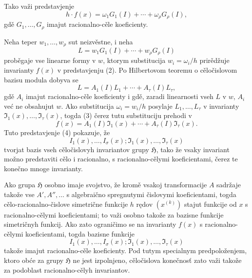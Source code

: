 \documentclass[11pt]{article}
\providecommand{\frH}{\mathfrak H}
\begin{document}
Tako važi predstavjenje
\begin{equation}
        h\cdot f(x)=\omega_1G_1(I)+\cdots+\omega_\rho G_\rho(I),
\end{equation}
gdě \(G_1,\ldots,G_\rho\) imajut racionalno-cěle koeficienty.

Neha teper \(w_1,\ldots,w_\rho\) sut neizvěstne, i neha
\[
        L=w_1G_1(I)+\cdots+w_\rho G_\rho(I)
\]
proběgaje vse linearne formy v \(w\), ktorym substitucija \(w_i=\omega_i/h\) prirědžuje invarianty \(f(x)\) v predstavjenju (2). Po Hilbertovom teoremu o cěločislovom bazisu modula dobyva se
\begin{equation}
        L=A_1(I)L_1+\cdots+A_\tau(I)L_\tau,
\end{equation}
gdě \(A_i\) imajut racionalno-cěle koeficienty i gdě, zaradi linearnosti vseh \(L\) v \(w\), \(A_i\) već ne obsahujut \(w\). Ako substitucija \(\omega_i=w_i/h\) posylaje \(L_1,\ldots,L_\tau\) v invarianty \(\mathfrak I_1(x),\ldots,\mathfrak I_\tau(x)\), togda (3) čerez tutu substituciju prehodi v
\begin{equation}
        f(x)=A_1(I)\mathfrak I_1(x)+\cdots+A_\tau(I)\mathfrak I_\tau(x).
\end{equation}
Tuto predstavjenje (4) pokazuje, že
\[
        I_1(x),\ldots,I_\sigma(x);\mathfrak I_1(x),\ldots,\mathfrak I_\tau(x)
\]
tvorjat bazis vseh cěločislovyh invariantov grupy \(\frH\), tako že vsaky invariant možno predstaviti cělo i racionalno, s racionalno-cělymi koeficientami, čerez te konečno mnoge invarianty.

Ako grupa \(\frH\) osobno imaje svojstvo, že kromě vsakoj transformacije \(A\) sadržaje takože vse \(A',A'',\ldots\) s algebraično spregnutymi čislovymi koeficientami, togda cělo-racionalno-čislove simetrične funkcije \(h\) rędov \((x^{(k)})\) stajut funkcije od \(x\) s racionalno-cělymi koeficientami; to važi osobno takože za bazisne funkcije simetričnyh funkcij. Ako zato ograničimo se na invarianty \(f(x)\) s racionalno-cělymi koeficientami, togda bazisne funkcije
\[
        I_1(x),\ldots,I_\sigma(x);\mathfrak I_1(x),\ldots,\mathfrak I_\tau(x)
\]
takože imajut racionalno-cěle koeficienty. Pod tutym specialnym predpoloženjem, ktoro obće za grupy \(\frH\) ne jest izpolnjeno, cěločislova konečnosť zato važi takože za podoblast racionalno-cělyh invariantov.
\end{document}
